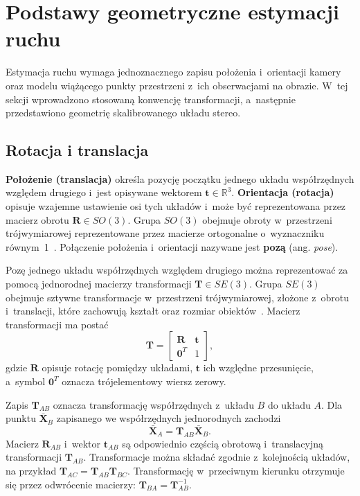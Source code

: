 \section{Podstawy geometryczne estymacji ruchu}
\label{sec:geometria_stereo}

Estymacja ruchu wymaga jednoznacznego zapisu położenia i~orientacji kamery oraz modelu wiążącego punkty przestrzeni z~ich obserwacjami na obrazie. W~tej sekcji wprowadzono stosowaną konwencję transformacji, a~następnie przedstawiono geometrię skalibrowanego układu stereo.

\subsection{Rotacja i translacja}
\label{subsec:translacja_i_rotacja}

\textbf{Położenie (translacja)} określa pozycję początku jednego układu współrzędnych względem drugiego i~jest opisywane wektorem $\mathbf{t}\in\mathbb{R}^3$. \textbf{Orientacja (rotacja)} opisuje wzajemne ustawienie osi tych układów i~może być reprezentowana przez macierz obrotu $\mathbf{R}\in SO(3)$. Grupa $SO(3)$ obejmuje obroty w~przestrzeni trójwymiarowej reprezentowane przez macierze ortogonalne o~wyznaczniku równym~1~\cite{blanco2021se3}. Połączenie położenia i~orientacji nazywane jest \textbf{pozą} (ang. \textit{pose}).

Pozę jednego układu współrzędnych względem drugiego można reprezentować za pomocą jednorodnej macierzy transformacji $\mathbf{T}\in SE(3)$. Grupa $SE(3)$ obejmuje sztywne transformacje w~przestrzeni trójwymiarowej, złożone z~obrotu i~translacji, które zachowują kształt oraz rozmiar obiektów~\cite{blanco2021se3}. Macierz transformacji ma postać
\begin{equation}
    \mathbf{T}
    =
    \begin{bmatrix}
        \mathbf{R} & \mathbf{t}\\
        \mathbf{0}^{T} & 1
    \end{bmatrix},
    \label{eq:se3_transform}
\end{equation}
gdzie $\mathbf{R}$ opisuje rotację pomiędzy układami, $\mathbf{t}$ ich względne przesunięcie, a~symbol $\mathbf{0}^{T}$ oznacza trójelementowy wiersz zerowy.

Zapis $\mathbf{T}_{A B}$ oznacza transformację współrzędnych z~układu $B$ do układu $A$. Dla punktu $\bar{\mathbf{X}}_B$ zapisanego we współrzędnych jednorodnych zachodzi
\begin{equation}
    \bar{\mathbf{X}}_A
    =
    \mathbf{T}_{A B}\bar{\mathbf{X}}_B.
    \label{eq:frame_transform}
\end{equation}
Macierz $\mathbf{R}_{A B}$ i~wektor $\mathbf{t}_{A B}$ są odpowiednio częścią obrotową i~translacyjną transformacji $\mathbf{T}_{A B}$. Transformacje można składać zgodnie z~kolejnością układów, na przykład $\mathbf{T}_{A C}=\mathbf{T}_{A B}\mathbf{T}_{B C}$. Transformację w~przeciwnym kierunku otrzymuje się przez odwrócenie macierzy: $\mathbf{T}_{B A}=\mathbf{T}_{A B}^{-1}$.

